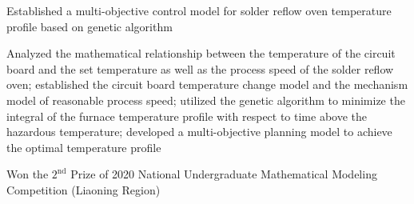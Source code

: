 \begin{cventries2}
{\begin{cvitems}
        \item Established a multi-objective control model for solder reflow oven temperature profile based on genetic algorithm  
        \item Analyzed the mathematical relationship between the temperature of the circuit board and the set temperature as well as the process speed of the solder reflow oven; established the circuit board temperature change model and the mechanism model of reasonable process speed; utilized the genetic algorithm to minimize the integral of the furnace temperature profile with respect to time above the hazardous temperature; developed a multi-objective planning model to achieve the optimal temperature profile
        \item Won the $2^{\text{nd}}$ Prize of 2020 National Undergraduate Mathematical Modeling Competition (Liaoning Region)
      \end{cvitems}
    }          



\end{cventries2}
